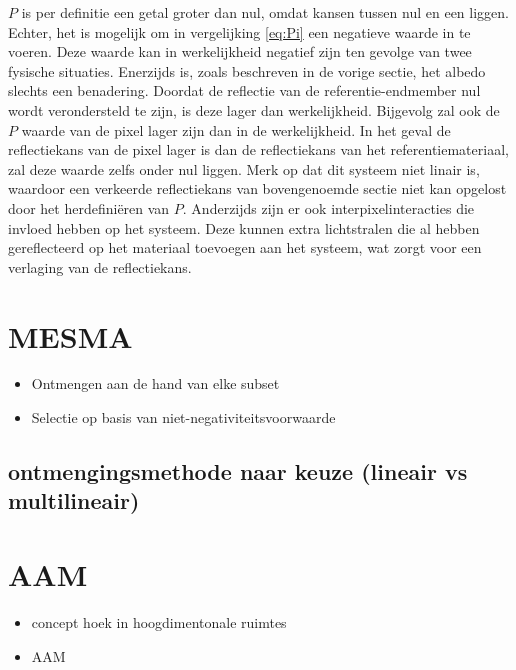 \documentclass[12pt]{report}
\begin{document}
$P$ is per definitie een getal groter dan nul, omdat kansen tussen nul en een liggen. Echter, het is mogelijk om in vergelijking \ref{eq:Pi} een negatieve waarde in te voeren. Deze waarde kan in werkelijkheid negatief zijn ten gevolge van twee fysische situaties. Enerzijds is, zoals beschreven in de vorige sectie, het albedo slechts een benadering. Doordat de reflectie van de referentie-endmember nul wordt verondersteld te zijn, is deze lager dan werkelijkheid. Bijgevolg zal ook de $P$ waarde van de pixel lager zijn dan in de werkelijkheid. In het geval de reflectiekans van de pixel lager is dan de reflectiekans van het referentiemateriaal, zal deze waarde zelfs onder nul liggen. Merk op dat dit systeem niet linair is, waardoor een verkeerde reflectiekans van bovengenoemde sectie niet kan opgelost door het herdefini\"eren van $P$. Anderzijds zijn er ook interpixelinteracties die invloed hebben op het systeem. Deze kunnen extra lichtstralen die al hebben gereflecteerd op het materiaal toevoegen aan het systeem, wat zorgt voor een verlaging van de reflectiekans. 






\section{MESMA} \label{sec:mesma}

\begin{itemize}
\item Ontmengen aan de hand van elke subset
\item Selectie op basis van niet-negativiteitsvoorwaarde
\end{itemize}

\subsection{ontmengingsmethode naar keuze (lineair vs multilineair)}

\section{AAM}

\begin{itemize}
\item concept hoek in hoogdimentonale ruimtes
\item AAM
\end{itemize}
\end{document}
